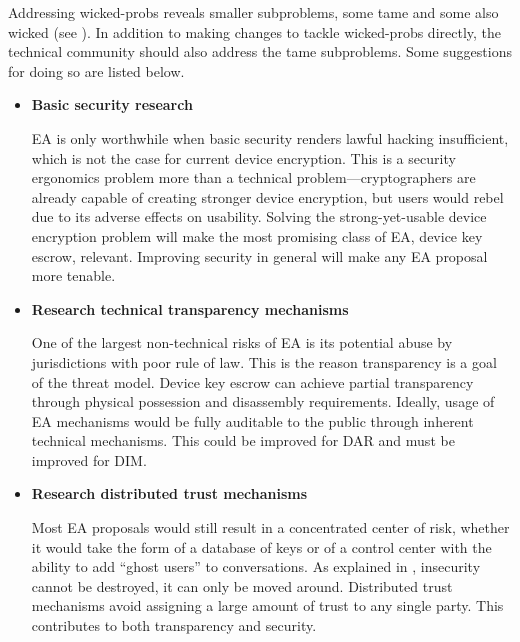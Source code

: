 Addressing \acp{wicked-prob} reveals smaller subproblems, some tame and some also wicked (see
). In addition to making changes to tackle \acp{wicked-prob} directly, the technical
community should also address the tame subproblems. Some suggestions for doing so are listed below.

\newcommand{\taskstart}[0]{\begin{itemize}}
\newcommand{\taskitem}[2]{ %
    \item \textbf{#1} \nopagebreak

    \vspace{0.5\baselineskip} \parbox{\linewidth}{#2} \vspace{0.5\baselineskip}
}
\newcommand{\taskend}{\end{itemize}}

\taskstart
    \taskitem{Basic security research}{

\ac{EA} is only worthwhile when basic security renders lawful hacking insufficient, which is not the case for current
device encryption. This is a security ergonomics problem more than a technical problem---cryptographers are already
capable of creating stronger device encryption, but users would rebel due to its adverse effects on usability. Solving
the strong-yet-usable device encryption problem will make the most promising class of \ac{EA}, device key escrow,
relevant. Improving security in general will make any \ac{EA} proposal more tenable.

}

    \taskitem{Research technical transparency mechanisms}{

One of the largest non-technical risks of \ac{EA} is its potential abuse by jurisdictions with poor rule of law. This is
the reason transparency is a goal of the threat model. Device key escrow can achieve partial transparency through
physical possession and disassembly requirements. Ideally, usage of \ac{EA} mechanisms would be fully auditable to the
public through inherent technical mechanisms. This could be improved for \acl{DAR} and must be improved for \acl{DIM}.

}

    \taskitem{Research distributed trust mechanisms}{

Most \ac{EA} proposals would still result in a concentrated center of risk, whether it would take the form of a database
of keys or of a control center with the ability to add ``ghost users'' to conversations. As explained in
\mysec{sec-premises}, insecurity cannot be destroyed, it can only be moved around. Distributed trust mechanisms avoid
assigning a large amount of trust to any single party. This contributes to both transparency and security.

}
\taskend

